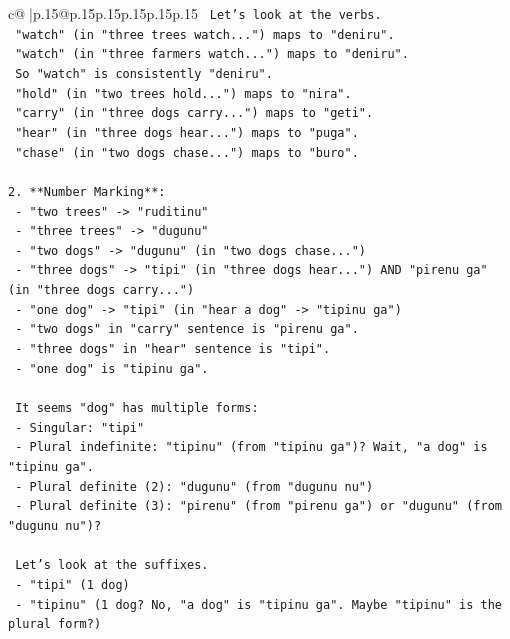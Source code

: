 \documentclass{article}
\begin{document}
{\begin{supertabular}{c@{$\;$}|p{.15\linewidth}@{}p{.15\linewidth}p{.15\linewidth}p{.15\linewidth}p{.15\linewidth}p{.15\linewidth}}
{{{\texttt{     Let's look at the verbs.} \\
\texttt{     "watch" (in "three trees watch...") maps to "deniru".} \\
\texttt{     "watch" (in "three farmers watch...") maps to "deniru".} \\
\texttt{     So "watch" is consistently "deniru".} \\
\texttt{     "hold" (in "two trees hold...") maps to "nira".} \\
\texttt{     "carry" (in "three dogs carry...") maps to "geti".} \\
\texttt{     "hear" (in "three dogs hear...") maps to "puga".} \\
\texttt{     "chase" (in "two dogs chase...") maps to "buro".} \\
\\ 
\texttt{2. **Number Marking**:} \\
\texttt{   {-} "two trees" {-}> "ruditinu"} \\
\texttt{   {-} "three trees" {-}> "dugunu"} \\
\texttt{   {-} "two dogs" {-}> "dugunu" (in "two dogs chase...")} \\
\texttt{   {-} "three dogs" {-}> "tipi" (in "three dogs hear...") AND "pirenu ga" (in "three dogs carry...")} \\
\texttt{   {-} "one dog" {-}> "tipi" (in "hear a dog" {-}> "tipinu ga")} \\
\texttt{   {-} "two dogs" in "carry" sentence is "pirenu ga".} \\
\texttt{   {-} "three dogs" in "hear" sentence is "tipi".} \\
\texttt{   {-} "one dog" is "tipinu ga".} \\
\\ 
\texttt{   It seems "dog" has multiple forms:} \\
\texttt{   {-} Singular: "tipi"} \\
\texttt{   {-} Plural indefinite: "tipinu" (from "tipinu ga")? Wait, "a dog" is "tipinu ga".} \\
\texttt{   {-} Plural definite (2): "dugunu" (from "dugunu nu")} \\
\texttt{   {-} Plural definite (3): "pirenu" (from "pirenu ga") or "dugunu" (from "dugunu nu")?} \\
\\ 
\texttt{   Let's look at the suffixes.} \\
\texttt{   {-} "tipi" (1 dog)} \\
\texttt{   {-} "tipinu" (1 dog? No, "a dog" is "tipinu ga". Maybe "tipinu" is the plural form?)} \\
}}}
\end{supertabular}}
\end{document}
